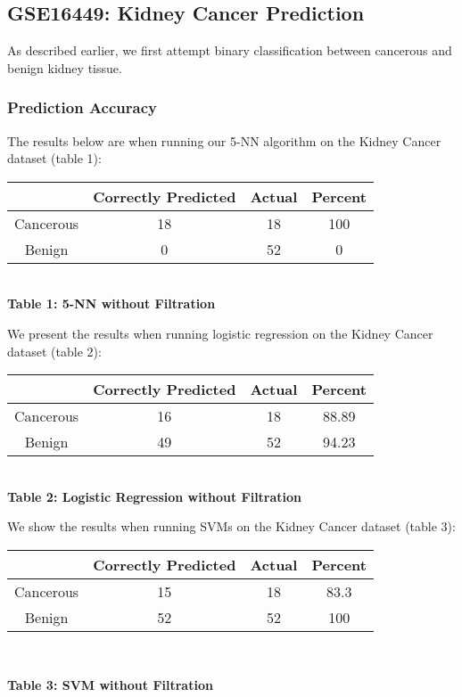 \documentclass[12pt]{scrartcl}
\begin{document}
    \subsection{GSE16449: Kidney Cancer Prediction}
    As described earlier, we first attempt binary classification between cancerous and benign kidney tissue. 
    \subsubsection{Prediction Accuracy}
    The results below are when running our 5-NN algorithm on the Kidney Cancer dataset (table 1):
   \begin{center}
        
   \begin{tabular}{c|c|c|c}
   \hline
   & Correctly Predicted & Actual & Percent\\
   \hline
   Cancerous & 18 & 18 & 100\\
   Benign & 0 & 52 & 0\\
   \hline
   \end{tabular}\\
   \vspace{0.1in}
   \textbf{Table 1: 5-NN without Filtration}
    \end{center}
    
    We present the results when running logistic regression on the Kidney Cancer dataset (table 2):
    
    \begin{center}
        
    \begin{tabular}{c|c|c|c}
    \hline
    & Correctly Predicted & Actual & Percent\\
    \hline
    Cancerous & 16 & 18 & 88.89\\
    Benign & 49 & 52 & 94.23\\
    \hline
    \end{tabular}\\
    \vspace{0.1in}
    \textbf{Table 2: Logistic Regression without Filtration}
    \end{center}
    
    We show the results when running SVMs on the Kidney Cancer dataset (table 3):
    
    \begin{center}
    \begin{tabular}{c|c|c|c}
    \hline
    & Correctly Predicted & Actual & Percent\\
    \hline
    Cancerous & 15 & 18 & 83.3\\
    Benign & 52 & 52 & 100\\
    \hline
    \end{tabular}\\
    \vspace{0.1in}
    
    \textbf{Table 3: SVM without Filtration}
    \end{center}
    
\end{document}
